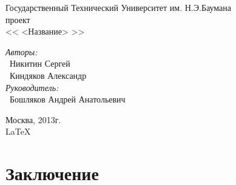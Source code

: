 \documentclass{article}
\begin{document}
\begin{titlepage}
\begin{center}
{ Государственный Технический Университет им. Н.Э.Баумана}
\\[50mm]
{ проект}
\\[7mm]
{\LARGE << <Название> >>}
\\[37mm]

\begin{flushright}
    \begin{minipage}{0.5\textwidth}
        \begin{flushleft}
            \textit{Авторы:} \\ 
            ~Никитин Сергей \\
            ~Киндяков Александр \\[10mm]
            \textit{Руководитель:} \\
            ~Бошляков Андрей Анатольевич
        \end{flushleft}
    \end{minipage}
\end{flushright}

\vfill %
Москва, 2013г. \\
\LaTeX
\end{center}
\end{titlepage}

\tableofcontents
\newpage






\newpage
\section{Заключение}


\end{document}
